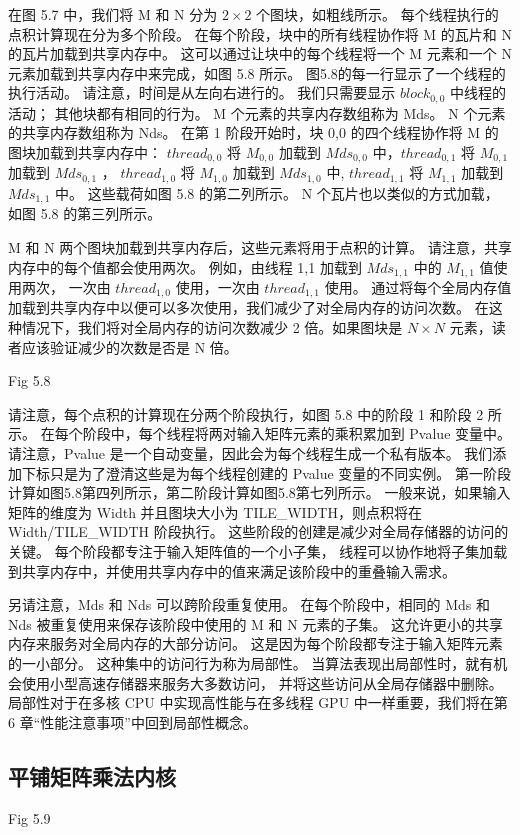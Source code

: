 在图 5.7 中，我们将 M 和 N 分为 $2 \times 2$ 个图块，如粗线所示。 每个线程执行的点积计算现在分为多个阶段。 
在每个阶段，块中的所有线程协作将 M 的瓦片和 N 的瓦片加载到共享内存中。 
这可以通过让块中的每个线程将一个 M 元素和一个 N 元素加载到共享内存中来完成，如图 5.8 所示。 
图5.8的每一行显示了一个线程的执行活动。 请注意，时间是从左向右进行的。 
我们只需要显示 $block_{0,0}$ 中线程的活动； 其他块都有相同的行为。 M 个元素的共享内存数组称为 Mds。 
N 个元素的共享内存数组称为 Nds。 在第 1 阶段开始时，块 0,0 的四个线程协作将 M 的图块加载到共享内存中：
$thread_{0,0}$ 将 $M_{0,0}$ 加载到 $Mds_{0,0}$ 中，$thread_{0,1}$ 将 $M_{0,1}$ 加载到 $Mds_{0,1}$ ，
$thread_{1,0}$ 将 $M_{1,0}$ 加载到 $Mds_{1,0}$ 中, $thread_{1,1}$ 将 $M_{1,1}$ 加载到 $Mds_{1,1}$ 中。 
这些载荷如图 5.8 的第二列所示。 N 个瓦片也以类似的方式加载，如图 5.8 的第三列所示。

M 和 N 两个图块加载到共享内存后，这些元素将用于点积的计算。 请注意，共享内存中的每个值都会使用两次。 
例如，由线程 1,1 加载到 $Mds_{1,1}$ 中的 $M_{1,1}$ 值使用两次，
一次由 $thread_{1,0}$ 使用，一次由 $thread_{1,1}$ 使用。 
通过将每个全局内存值加载到共享内存中以便可以多次使用，我们减少了对全局内存的访问次数。 
在这种情况下，我们将对全局内存的访问次数减少 2 倍。如果图块是 $N \times N$ 元素，读者应该验证减少的次数是否是 N 倍。

{\color{red} Fig 5.8}

请注意，每个点积的计算现在分两个阶段执行，如图 5.8 中的阶段 1 和阶段 2 所示。 
在每个阶段中，每个线程将两对输入矩阵元素的乘积累加到 Pvalue 变量中。 
请注意，Pvalue 是一个自动变量，因此会为每个线程生成一个私有版本。 
我们添加下标只是为了澄清这些是为每个线程创建的 Pvalue 变量的不同实例。 
第一阶段计算如图5.8第四列所示，第二阶段计算如图5.8第七列所示。 
一般来说，如果输入矩阵的维度为 Width 并且图块大小为 TILE\_WIDTH，则点积将在 Width/TILE\_WIDTH 阶段执行。 
这些阶段的创建是减少对全局存储器的访问的关键。 每个阶段都专注于输入矩阵值的一个小子集，
线程可以协作地将子集加载到共享内存中，并使用共享内存中的值来满足该阶段中的重叠输入需求。

另请注意，Mds 和 Nds 可以跨阶段重复使用。 
在每个阶段中，相同的 Mds 和 Nds 被重复使用来保存该阶段中使用的 M 和 N 元素的子集。 
这允许更小的共享内存来服务对全局内存的大部分访问。 这是因为每个阶段都专注于输入矩阵元素的一小部分。 
这种集中的访问行为称为局部性。 当算法表现出局部性时，就有机会使用小型高速存储器来服务大多数访问，
并将这些访问从全局存储器中删除。 
局部性对于在多核 CPU 中实现高性能与在多线程 GPU 中一样重要，我们将在第 6 章“性能注意事项”中回到局部性概念。

\subsection{平铺矩阵乘法内核}
{\color{red} Fig 5.9}

